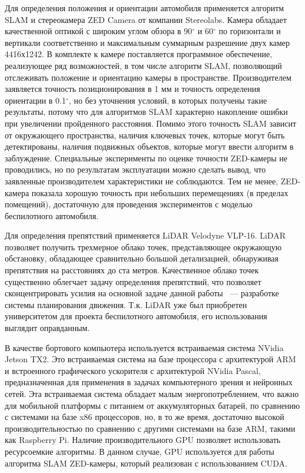Для определения положения и ориентации автомобиля применяется алгоритм SLAM и стереокамера ZED Camera
\cite{jetson_car_zed} от компании Stereolabs. Камера обладает качественной оптикой с широким углом обзора в
90$^{\circ}$ и 60$^{\circ}$ по горизонтали и вертикали соответственно и максимальным суммарным разрешение двух
камер 4416х1242. В комплекте к камере поставляется программное обеспечение, реализующее ряд возможностей,
в том числе алгоритм SLAM, позволяющий отслеживать положение и ориентацию камеры в пространстве.
Производителем заявляется точность позиционирования в 1 мм и точность определения ориентации в 0.1$^{\circ}$,
но без уточнения условий, в которых получены такие результаты, потому что для алгоритмов SLAM характерно
накопление ошибки при увеличении пройденного расстояния. Помимо этого точность SLAM зависит от окружающего
пространства, наличия ключевых точек, которые могут быть детектированы, наличия подвижных объектов, которые
могут ввести алгоритм в заблуждение. Специальные эксперименты по оценке точности ZED-камеры не проводились, но
по результатам эксплуатации можно сделать вывод, что заявленные производителем характеристики не соблюдаются. Тем не
менее, ZED-камера показала хорошую точность при небольших перемещениях (в пределах помещений), достаточную для
проведения экспериментов с моделью беспилотного автомобиля.

Для определения препятствий применяется LiDAR Velodyne VLP-16. LiDAR позволяет получить
трехмерное облако точек, представляющее окружающую обстановку, обладающее сравнительно большой детализацией, обнаруживая
препятствия на расстояниях до ста метров. Качественное облако точек существенно облегчает задачу определения препятствий,
что позволяет сконцентрировать усилия на основной задаче данной работы ~--- разработке системы планирования движения.
Т.к. LiDAR уже был приобретен университетом для проекта беспилотного автомобиля, его использования выглядит оправданным.

В качестве бортового компьютера используется встраиваемая система NVidia Jetson TX2. Это встраиваемая система на базе
процессора с архитектурой ARM и встроенного графического ускорителя с архитектурой NVidia Pascal, предназначенная для
применения в задачах компьютерного зрения и нейронных сетей. Эта встраиваемая система обладает малым энергопотреблением,
что важно для мобильной платформы с питанием от аккумуляторных батарей, по сравнению с системами на базе x86 процессоров,
но, в то же время, достаточно высокой производительностью по сравнению с другими системами на базе ARM, такими как
Raspberry Pi. Наличие производительного GPU позволяет использовать ресурсоемкие алгоритмы. В данном случае, GPU используется
для работы алгоритма SLAM ZED-камеры, который реализован с использованием CUDA.

